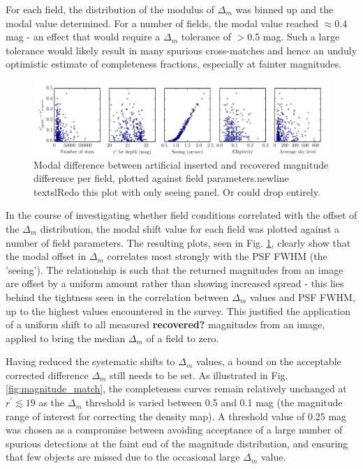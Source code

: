 \documentclass[a4paper,useAMS,usenatbib]{mn2e}
\begin{document}
For each field, the distribution of the modulus of $\Delta_m$ was binned up and the 
modal value determined. For a number of fields, the modal value reached $\approx$0.4
mag - an effect that would require a $\Delta_m$ tolerance of $>$0.5 mag. Such
a large tolerance would likely result in many spurious cross-matches and hence
an unduly optimistic estimate of completeness fractions, especially at fainter
magnitudes.

\begin{figure}
\begin{center}
\includegraphics[width=1\linewidth]{figures/magdiff_parameters.pdf} 
\caption{\footnotesize{Modal difference between artificial inserted and
recovered magnitude difference per field, plotted against field
parameters.newline textsl{Redo this plot with only seeing panel. Or could
drop entirely.}}}
\label{fig:magdiff_parameters}
\end{center}
\end{figure}

In the course of investigating whether field conditions correlated with the
offset of the $\Delta_m$ distribution, the modal shift value for each field
was plotted against a number of field parameters. The resulting plots, seen in
Fig. \ref{fig:magdiff_parameters}, clearly show that the modal offset in $\Delta_m$
correlates most strongly with the PSF FWHM (the 'seeing').  The relationship
is such that the returned magnitudes from an image are offset by a uniform amount 
rather than showing increased spread - this lies behind the tightness seen in 
the correlation between $\Delta_m$ values and PSF FWHM, up to the highest
values encountered in the survey. This justified the application of a uniform
shift to all measured {\bf recovered?} magnitudes from an image, applied to bring 
the median $\Delta_m$ of a field to zero.

Having reduced the systematic shifts to $\Delta_m$ values, a bound on the acceptable
corrected difference $\Delta_m$ still needs to be set. As illustrated in 
Fig. \ref{fig:magnitude_match}, the completeness curves
remain relatively unchanged at $r^{\prime}\lesssim19$ as the $\Delta_m$ threshold is
varied between 0.5 and 0.1 mag (the magnitude range of interest for correcting
the density map). A threshold value of 0.25 mag was chosen as a compromise
between avoiding acceptance of a large number of spurious detections at the faint
end of the magnitude distribution, and ensuring that few objects are missed
due to the occasional large $\Delta_m$ value.
\end{document}
